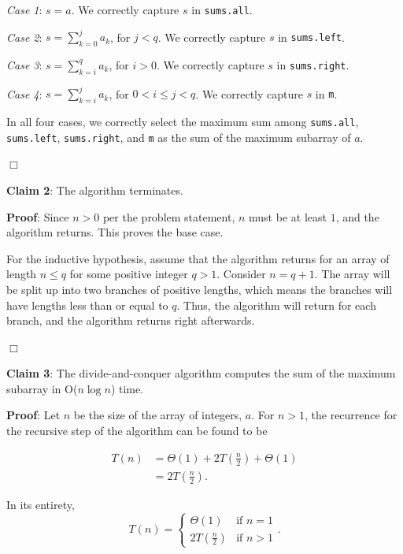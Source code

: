 \documentclass[a4paper,10pt]{article}
\begin{document}
		{\it Case 1}: $\displaystyle s = a$. We correctly capture $s$ in {\tt sums.all}.

		{\it Case 2}: $\displaystyle s = \sum_{k=0}^j a_k$, for $j < q$. We correctly capture $s$ in {\tt sums.left}.

		{\it Case 3}: $\displaystyle s = \sum_{k=i}^q a_k$, for $i > 0$. We correctly capture $s$ in {\tt sums.right}.

		{\it Case 4}: $\displaystyle s = \sum_{k=i}^j a_k$, for $0 < i \leq j < q$. We correctly capture $s$ in {\tt m}.

		In all four cases, we correctly select the maximum sum among {\tt sums.all}, {\tt sums.left}, {\tt sums.right}, and {\tt m} as the sum of the maximum subarray of $a$.

		\begin{center}
		$\Box$
		\end{center}

		
		{\bf Claim 2}: The algorithm terminates.

		{\bf Proof}: Since $n>0$ per the problem statement, $n$ must be at least $1$, and the algorithm returns. This proves the base case.

		For the inductive hypothesis, assume that the algorithm returns for an array of length $n \leq q$ for some positive integer $q>1$. Consider $n=q+1$. The array will be split up into two branches of positive lengths, which means the branches will have lengths less than or equal to $q$. Thus, the algorithm will return for each branch, and the algorithm returns right afterwards.

		\begin{center}
		$\Box$
		\end{center}


		{\bf Claim 3}: The divide-and-conquer algorithm computes the sum of the maximum subarray in O($n \log n$) time.

		{\bf Proof}: Let $n$ be the size of the array of integers, $a$. For $n>1$, the recurrence for the recursive step of the algorithm can be found to be

		\begin{align*}
		T(n) &= \Theta(1) + 2T\left(\frac{n}{2}\right) + \Theta(1) \\
		     &= 2T\left(\frac{n}{2}\right).
		\end{align*}

		In its entirety, \[T(n) = \begin{cases} \Theta(1) &\mbox{if } n = 1 \\ 2T\left(\frac{n}{2}\right) &\mbox{if } n > 1 \end{cases}.\]
\end{document}
